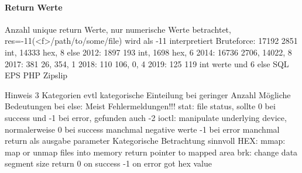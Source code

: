         \paragraph{Return Werte}
            Anzahl unique return Werte, nur numerische Werte betrachtet, 
            res=-11(<f>/path/to/some/file) wird als -11 interpretiert
            Bruteforce: 17192 2851 int, 14333 hex, 8 else
            2012:       1897 193 int, 1698 hex, 6
            2014:       16736 2706, 14022, 8
            2017:       381 26, 354, 1 
            2018:       110 106, 0, 4 
            2019:       125 119 int werte und 6 else
            SQL
            EPS
            PHP
            Zipslip

            Hinweis 3 Kategorien evtl kategorische Einteilung bei geringer Anzahl
            Mögliche Bedeutungen bei else:
                Meist Fehlermeldungen!!!
                stat:
                    file status, 
                    sollte 0 bei success und -1 bei error, gefunden auch -2 
                ioctl:
                    manipulate underlying device, 
                    normalerweise 0 bei success manchmal negative werte
                    -1 bei error
                    manchmal return als ausgabe parameter
                Kategorische Betrachtung sinnvoll
            HEX:\@
                mmap:
                    map or unmap files into memory
                    return pointer to mapped area
                brk:
                    change data segment size
                    return 0 on success -1 on error
                    got hex value

